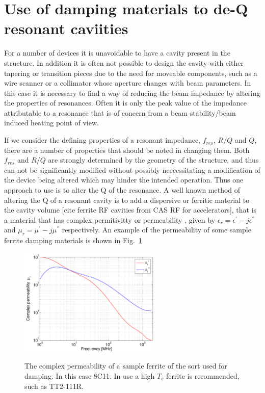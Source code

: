\section{Use of damping materials to de-Q resonant caviities}
\label{sec:damping_materials}

For a number of devices it is unavoidable to have a cavity present in the structure. In addition it is often not possible to design the cavity with either tapering or transition pieces due to the need for moveable components, such as a wire scanner or a collimator whose aperture changes with beam parameters. In this case it is necessary to find a way of reducing the beam impedance by altering the properties of resonances. Often it is only the peak value of the impedance attributable to a resonance that is of concern from a beam stability/beam induced heating point of view. 

If we consider the defining properties of a resonant impedance, $f_{res}$, $R/Q$ and $Q$, there are a number of properties that should be noted in changing them. Both $f_{res}$ and $R/Q$ are strongly determined by the geometry of the structure, and thus can not be significantly modified without possibly neccessitating a modification of the device being altered which may hinder the intended operation. Thus one approach to use is to alter the Q of the resonance. A well known method of altering the Q of a resonant cavity is to add a dispersive or ferritic material to the cavity volume [cite ferrite RF cavities from CAS RF for accelerators], that is a material that has complex permitivitty or permeability , given by $\epsilon_{r} = \epsilon^{'} - j \epsilon^{''}$ and $\mu_{r} = \mu^{'} - j \mu^{''}$ respectively. An example of the permeability of some sample ferrite damping materials is shown in Fig.~\ref{fig:ferr_mu_damp}

\begin{figure}
\includegraphics[width=0.6\textwidth]{Beam_Coupling_Impedance_Reduction_Techniques/figures/Ferrite8C11.pdf}
\label{fig:ferr_mu_damp}
\caption{The complex permeability of a sample ferrite of the sort used for damping. In this case 8C11. In use a high $T_{c}$ ferrite is recommended, such as TT2-111R.}
\end{figure}

